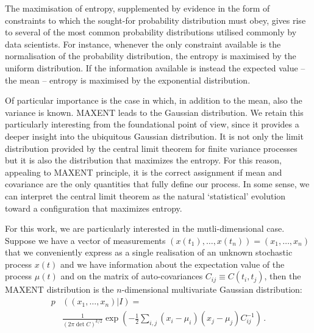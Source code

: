 \documentclass[twocolumn,showpacs,preprintnumbers,nofootinbib,prd,
superscriptaddress,10pt]{revtex4-1}
\begin{document}
The maximisation of entropy, supplemented by evidence in the form of constraints to which the sought-for probability distribution must obey,
gives rise to several of the most common probability distributions utilised commonly by data scientists. For instance, whenever the only constraint available is the normalisation of the probability distribution, the entropy is maximised by the uniform distribution. 
If the information available is instead the expected value -- the mean -- entropy is maximised by the  exponential distribution.

Of particular importance is the case in which, in addition to the mean, also the variance is known. MAXENT leads to the Gaussian distribution. 
We retain this particularly interesting from the foundational point of view, since it provides a deeper insight into the ubiquitous Gaussian distribution.
It is not only the limit distribution provided by the central limit theorem for finite variance processes but it is also the distribution that maximizes the entropy. For this reason, appealing to MAXENT principle, it is the correct assignment if mean and covariance are the only quantities that fully define our process. In some sense, we can interpret the central limit theorem as the natural `statistical' evolution toward a configuration that maximizes entropy.

For this work, we are particularly interested in the mutli-dimensional case. Suppose we have a vector of measurements $(x(t_1),\ldots,x(t_n)) = (x_1, \ldots, x_n)$ that we conveniently express as a single realisation of an unknown stochastic process $x(t)$ and we have information about the expectation value of the process $\mu(t)$ and on the matrix of auto-covariances $C_{ij} \equiv C(t_i,t_j)$, then the MAXENT distribution is the $n$-dimensional multivariate Gaussian distribution\cite{gregory_2005}: 
\begin{align}
    p&\left((x_1, \ldots, x_n)\vert I\right) = \nonumber \\
    &\frac{1}{\left(2 \pi \det C\right)^{k / 2}}\exp\left(-\frac{1}{2}\sum_{i,j}(x_i-\mu_i) (x_j-\mu_j)C^{-1}_{ij} \right)\,. 
\end{align}
\end{document}

